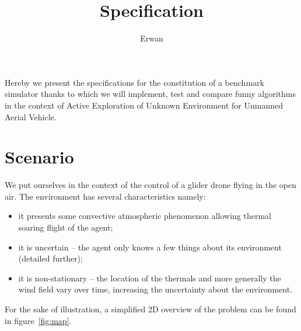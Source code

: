 \documentclass[]{article}
\begin{document}
\title{Specification}
\author{Erwan}

\maketitle

\noindent Hereby we present the specifications for the constitution of a benchmark simulator thanks to which we will implement, test and compare funny algorithms in the context of Active Exploration of Unknown Environment for
Unmanned Aerial Vehicle.

\section*{Scenario}
We put ourselves in the context of the control of a glider drone flying in the open air. The environment has several characteristics namely:
\begin{itemize}
	\item it presents some convective atmospheric phenomenon allowing thermal soaring flight of the agent;
	\item it is uncertain -- the agent only knows a few things about its environment (detailed further);
	\item it is non-stationary -- the location of the thermals and more generally the wind field vary over time, increasing the uncertainty about the environment.
\end{itemize}
For the sake of illustration, a simplified 2D overview of the problem can be found in figure~\ref{fig:map}.
\end{document}
